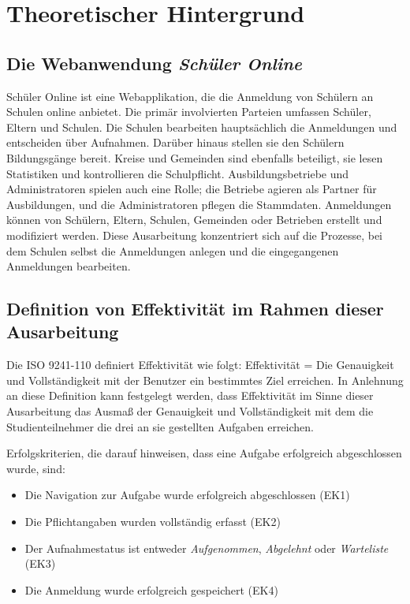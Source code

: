 \section{Theoretischer Hintergrund}
\subsection{Die Webanwendung \textit{Schüler Online}}
Schüler Online ist eine Webapplikation, die die Anmeldung von Schülern an Schulen online anbietet. Die primär involvierten Parteien umfassen Schüler, Eltern und Schulen. Die Schulen bearbeiten hauptsächlich die Anmeldungen und entscheiden über Aufnahmen. Darüber hinaus stellen sie den Schülern Bildungsgänge bereit. Kreise und Gemeinden sind ebenfalls beteiligt, sie lesen Statistiken und kontrollieren die Schulpflicht. Ausbildungsbetriebe und Administratoren spielen auch eine Rolle; die Betriebe agieren als Partner für Ausbildungen, und die Administratoren pflegen die Stammdaten. Anmeldungen können von Schülern, Eltern, Schulen, Gemeinden oder Betrieben erstellt und modifiziert werden.\cite{ProductOwner2023} Diese Ausarbeitung konzentriert sich auf die Prozesse, bei dem Schulen selbst die Anmeldungen anlegen und die eingegangenen Anmeldungen bearbeiten.

\subsection{Definition von Effektivität im Rahmen dieser Ausarbeitung }
Die ISO 9241-110 definiert Effektivität wie folgt: \glqq Effektivität = Die Genauigkeit und Vollständigkeit mit der Benutzer ein bestimmtes Ziel erreichen.\grqq{}\cite{ISO-9241-110}
In Anlehnung an diese Definition kann festgelegt werden, dass Effektivität im Sinne dieser Ausarbeitung das Ausmaß der Genauigkeit und Vollständigkeit mit dem die Studienteilnehmer die drei an sie gestellten Aufgaben erreichen. 

Erfolgskriterien, die darauf hinweisen, dass eine Aufgabe erfolgreich abgeschlossen wurde, sind: 
\begin{itemize}
    \item Die Navigation zur Aufgabe wurde erfolgreich abgeschlossen (EK1)
    \item Die Pflichtangaben wurden vollständig erfasst (EK2)
    \item Der Aufnahmestatus ist entweder \textit{Aufgenommen}, \textit{Abgelehnt} oder \textit{Warteliste} (EK3)
    \item Die Anmeldung wurde erfolgreich gespeichert (EK4)
\end{itemize}


